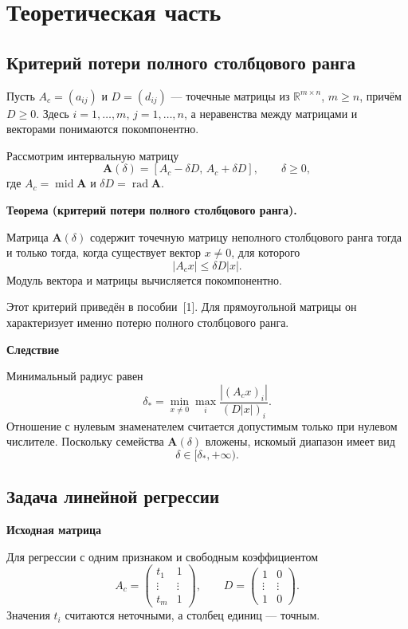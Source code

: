 \documentclass[12pt,a4paper]{article}
\numberwithin{equation}{section}
\newcommand{\theorypart}[1]{%
    \par\medskip
    \noindent\textbf{#1}\par\nopagebreak\smallskip
}
\newenvironment{criterionbox}
{%
    \par\medskip
    \begin{center}
    \begin{lrbox}{\criterioncontent}
    \begin{minipage}{0.90\textwidth}
    \textbf{Теорема (критерий потери полного столбцового ранга).}\par\smallskip
}
{%
    \end{minipage}
    \end{lrbox}
    \setlength{\fboxsep}{9pt}%
    \fbox{\usebox{\criterioncontent}}
    \end{center}
    \medskip
}
\begin{document}
\section{Теоретическая часть}

\subsection{Критерий потери полного столбцового ранга}

Пусть $A_c=(a_{ij})$ и $D=(d_{ij})$ --- точечные матрицы из
$\mathbb{R}^{m\times n}$, $m\geq n$, причём $D\geq0$. Здесь
$i=1,\ldots,m$, $j=1,\ldots,n$, а неравенства между матрицами и
векторами понимаются покомпонентно.

Рассмотрим интервальную матрицу
\[
    \boldsymbol{A}(\delta)
    = [A_c-\delta D,\,A_c+\delta D],
    \qquad \delta\geq0,
\]
где $A_c=\operatorname{mid}\boldsymbol{A}$ и
$\delta D=\operatorname{rad}\boldsymbol{A}$.

\begin{criterionbox}
Матрица $\boldsymbol{A}(\delta)$ содержит точечную матрицу неполного
столбцового ранга тогда и только тогда, когда существует вектор
$x\neq0$, для которого
\[
    |A_cx|\leq\delta D|x|.
\]
Модуль вектора и матрицы вычисляется покомпонентно.
\end{criterionbox}

Этот критерий приведён в пособии~[1]. Для прямоугольной матрицы он
характеризует именно потерю полного столбцового ранга.

\theorypart{Следствие}
Минимальный радиус равен
\[
    \delta_* = \min_{x\neq0}\max_i
    \frac{|(A_cx)_i|}{(D|x|)_i}.
\]
Отношение с нулевым знаменателем считается допустимым только при
нулевом числителе. Поскольку семейства $\boldsymbol{A}(\delta)$
вложены, искомый диапазон имеет вид
\[
    \delta\in[\delta_*,+\infty).
\]

\subsection{Задача линейной регрессии}

\theorypart{Исходная матрица}
Для регрессии с одним признаком и свободным коэффициентом
\[
    A_c=
    \begin{pmatrix}
        t_1 & 1\\
        \vdots & \vdots\\
        t_m & 1
    \end{pmatrix},
    \qquad
    D=
    \begin{pmatrix}
        1 & 0\\
        \vdots & \vdots\\
        1 & 0
    \end{pmatrix}.
\]
Значения $t_i$ считаются неточными, а столбец единиц --- точным.
\end{document}
